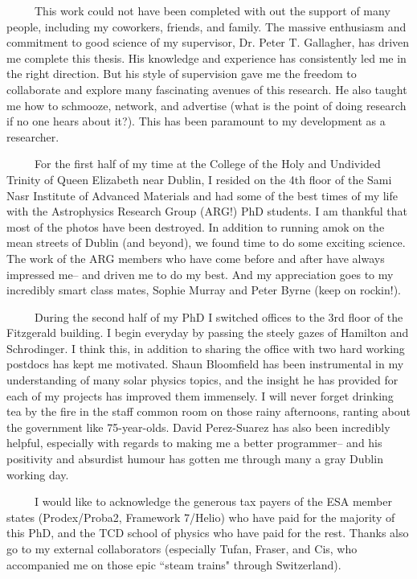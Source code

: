 \begin{acknowledgements}      %
~~~~~This work could not have been completed with out the support of many people, including my coworkers, friends, and family. The massive enthusiasm and commitment to good science of my supervisor, Dr. Peter T. Gallagher, has driven me complete this thesis. His knowledge and experience has consistently led me in the right direction. But his style of supervision gave me the freedom to collaborate and explore many fascinating avenues of this research. He also taught me how to schmooze, network, and advertise (what is the point of doing research if no one hears about it?). This has been paramount to my development as a researcher.

~~~~~For the first half of my time at the College of the Holy and Undivided Trinity of Queen Elizabeth near Dublin, I resided on the 4th floor of the Sami Nasr Institute of Advanced Materials and had some of the best times of my life with the Astrophysics Research Group (ARG!) PhD students. I am thankful that most of the photos have been destroyed. In addition to running amok on the mean streets of Dublin (and beyond), we found time to do some exciting science. The work of the ARG members who have come before and after have always impressed me-- and driven me to do my best. And my appreciation goes to my incredibly smart class mates, Sophie Murray and Peter Byrne (keep on rockin!). 

~~~~~During the second half of my PhD I switched offices to the 3rd floor of the Fitzgerald building. I begin everyday by passing the steely gazes of Hamilton and Schrodinger. I think this, in addition to sharing the office with two hard working postdocs has kept me motivated. Shaun Bloomfield has been instrumental in my understanding of many solar physics topics, and the insight he has provided for each of my projects has improved them immensely. I will never forget drinking tea by the fire in the staff common room on those rainy afternoons, ranting about the government like 75-year-olds. David Perez-Suarez has also been incredibly helpful, especially with regards to making me a better programmer-- and his positivity and absurdist humour has gotten me through many a gray Dublin working day. 

~~~~~I would like to acknowledge the generous tax payers of the ESA member states (Prodex/Proba2, Framework 7/Helio) who have paid for the majority of this PhD, and the TCD school of physics who have paid for the rest. Thanks also go to my external collaborators (especially Tufan, Fraser, and Cis, who accompanied me on those epic ``steam trains" through Switzerland).


\end{acknowledgements}
